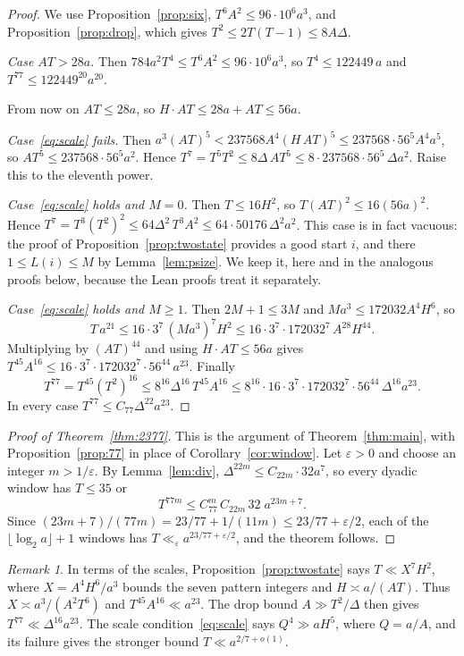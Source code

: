 \documentclass[11pt]{amsart}
\theoremstyle{definition}
\theoremstyle{remark}
\newtheorem{remark}[theorem]{Remark}
\begin{document}
\begin{proof}
We use Proposition~\ref{prop:six}, $T^6A^2\le96\cdot10^6a^3$, and
Proposition~\ref{prop:drop}, which gives $T^2\le 2T(T-1)\le 8A\Delta$.

\emph{Case $AT>28a$.} Then $784a^2T^4\le T^6A^2\le96\cdot10^6a^3$, so $T^4\le122449\,a$ and
$T^{77}\le 122449^{20}a^{20}$.

From now on $AT\le28a$, so $H\cdot AT\le 28a+AT\le 56a$.

\emph{Case~\eqref{eq:scale} fails.} Then $a^3(AT)^5<237568A^4(H\,AT)^5\le 237568\cdot56^5A^4a^5$,
so $AT^5\le237568\cdot56^5a^2$. Hence $T^7=T^5T^2\le 8\Delta\,AT^5\le 8\cdot237568\cdot56^5\,\Delta a^2$.
Raise this to the eleventh power.

\emph{Case~\eqref{eq:scale} holds and $M=0$.} Then $T\le16H^2$, so
$T(AT)^2\le16(56a)^2$. Hence $T^7=T^3(T^2)^2\le 64\Delta^2\,T^3A^2\le 64\cdot50176\,\Delta^2a^2$.
This case is in fact vacuous: the proof of Proposition~\ref{prop:twostate} provides a good
start $i$, and there $1\le L(i)\le M$ by Lemma~\ref{lem:psize}. We keep it, here and in the
analogous proofs below, because the Lean proofs treat it separately.

\emph{Case~\eqref{eq:scale} holds and $M\ge1$.} Then $2M+1\le3M$ and $Ma^3\le172032A^4H^6$, so
\[
T\,a^{21}\le 16\cdot3^7\,(Ma^3)^7H^2\le 16\cdot3^7\cdot172032^7\,A^{28}H^{44}.
\]
Multiplying by $(AT)^{44}$ and using $H\cdot AT\le56a$ gives
$T^{45}A^{16}\le 16\cdot3^7\cdot172032^7\cdot56^{44}\,a^{23}$. Finally
\[
T^{77}=T^{45}(T^2)^{16}\le 8^{16}\Delta^{16}\,T^{45}A^{16}
\le 8^{16}\cdot16\cdot3^7\cdot172032^7\cdot56^{44}\,\Delta^{16}a^{23}.
\]
In every case $T^{77}\le C_{77}\Delta^{22}a^{23}$.
\end{proof}

\begin{proof}[Proof of Theorem~\ref{thm:2377}]
This is the argument of Theorem~\ref{thm:main}, with Proposition~\ref{prop:77} in place of
Corollary~\ref{cor:window}. Let $\varepsilon>0$ and choose an integer $m>1/\varepsilon$. By
Lemma~\ref{lem:div}, $\Delta^{22m}\le C_{22m}\cdot32a^7$, so every dyadic window has
$T\le35$ or
\[
T^{77m}\le C_{77}^m\,C_{22m}\,32\;a^{23m+7}.
\]
Since $(23m+7)/(77m)=23/77+1/(11m)\le23/77+\varepsilon/2$, each of the $\lfloor\log_2a\rfloor+1$
windows has $T\ll_\varepsilon a^{23/77+\varepsilon/2}$, and the theorem follows.
\end{proof}

\begin{remark}\label{rem:2377}
In terms of the scales, Proposition~\ref{prop:twostate} says $T\ll X^7H^2$, where
$X=A^4H^6/a^3$ bounds the seven pattern integers and $H\asymp a/(AT)$. Thus
$X\asymp a^3/(A^2T^6)$ and $T^{45}A^{16}\ll a^{23}$. The drop bound $A\gg T^2/\Delta$ then gives
$T^{77}\ll\Delta^{16}a^{23}$. The scale condition~\eqref{eq:scale} says $Q^4\gg aH^5$, where
$Q=a/A$, and its failure gives the stronger bound $T\ll a^{2/7+o(1)}$.
\end{remark}
\end{document}

